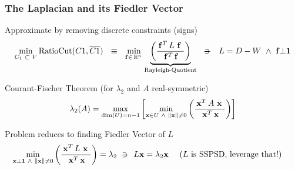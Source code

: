 \begin{frame}
  \frametitle{The Laplacian and its Fiedler Vector}
  \begin{block}{Approximate by removing discrete constraints (signs)}
    \[
\joinabove{0}
\min\limits_{C_1 \ds{\subset} V} \func{RatioCut}(C1,\stcomp{C1})
\ds{\ds{\equiv}}
\min\limits_{\vec{f} \in \R{n}}
  \underbrace{
    \left(\dfrac{\trans{\vec{f}} L \ds{\vec{f}}}{\trans{\vec{f}} \vec{f}}\right)
  }_{\text{Rayleigh-Quotient}}    
\ds{\suchthat}
L = D - W
\ds{\land}
\vec{f} \bot \vec{1}
\joinbelow{0}
\]    
  \end{block}
  \begin{block}{Courant-Fischer Theorem (for $\lambda_2$ and $A$ real-symmetric)}
\[
\joinabove{0}
\lambda_2(A) =
\max\limits_{\func{dim}(U) = n-1}
\left[
\min\limits_{\vec{x} \in U \ds{\land} \norm{\vec{x}} \ne 0}
\left(  
\dfrac{\trans{\vec{x}} A \ds{\vec{x}}}{\trans{\vec{x}} \vec{x}}
\right)
\right]
\]    
  \end{block}

  \begin{block}{Problem reduces to finding Fiedler Vector of $L$}
\[
\min\limits_{\vec{x} \bot \vec{1} \ds{\land} \norm{\vec{x}} \ne 0}
\left(  
\dfrac{\trans{\vec{x}} L \ds{\vec{x}}}{\trans{\vec{x}} \vec{x}}
\right)
= \lambda_2
\suchthat{L\vec{x} = \lambda_2\vec{x}}
\ds{\ds{\ds{\ds{\text{($L$ is SSPSD, leverage that!)}}}}}
\]    
  \end{block}
\end{frame}
